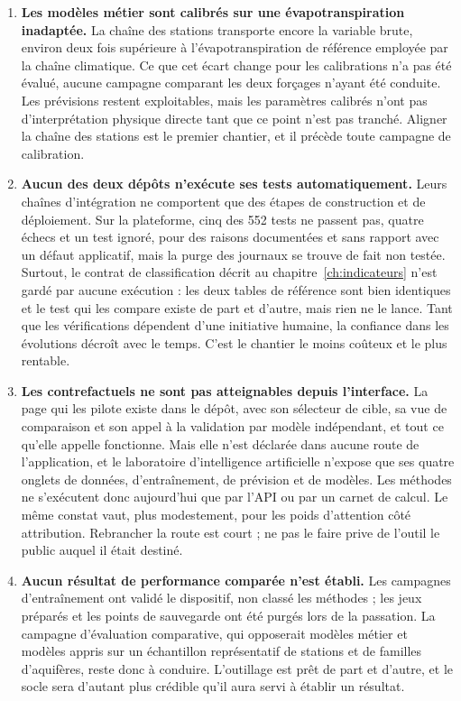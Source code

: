 \begin{enumerate}
  \item \textbf{Les modèles métier sont calibrés sur une évapotranspiration inadaptée.} La
  chaîne des stations transporte encore la variable brute, environ deux fois supérieure à
  l'évapotranspiration de référence employée par la chaîne climatique. Ce que cet écart change
  pour les calibrations n'a pas été évalué, aucune campagne comparant les deux forçages n'ayant
  été conduite. Les prévisions restent exploitables, mais les paramètres calibrés n'ont pas
  d'interprétation physique directe tant que ce point n'est pas tranché.
  Aligner la chaîne des stations est le premier chantier, et il précède toute campagne de
  calibration.

  \item \textbf{Aucun des deux dépôts n'exécute ses tests automatiquement.} Leurs chaînes
  d'intégration ne comportent que des étapes de construction et de déploiement. Sur la
  plateforme, cinq des \num{552} tests ne passent pas, quatre échecs et un test ignoré, pour des
  raisons documentées et sans rapport avec un défaut applicatif, mais la purge des journaux se
  trouve de fait non testée. Surtout, le contrat de classification décrit au
  chapitre~\ref{ch:indicateurs} n'est gardé par aucune exécution : les deux tables de référence
  sont bien identiques et le test qui les compare existe de part et d'autre, mais rien ne le
  lance. Tant que les vérifications dépendent d'une initiative humaine, la confiance dans les
  évolutions décroît avec le temps. C'est le chantier le moins coûteux et le plus rentable.

  \item \textbf{Les contrefactuels ne sont pas atteignables depuis l'interface.} La page qui les
  pilote existe dans le dépôt, avec son sélecteur de cible, sa vue de comparaison et son appel à
  la validation par modèle indépendant, et tout ce qu'elle appelle fonctionne. Mais elle n'est
  déclarée dans aucune route de l'application, et le laboratoire d'intelligence artificielle
  n'expose que ses quatre onglets de données, d'entraînement, de prévision et de modèles. Les
  méthodes ne s'exécutent donc aujourd'hui que par l'API ou par un carnet de calcul. Le même
  constat vaut, plus modestement, pour les poids d'attention côté attribution. Rebrancher la
  route est court ; ne pas le faire prive de l'outil le public auquel il était destiné.

  \item \textbf{Aucun résultat de performance comparée n'est établi.} Les campagnes
  d'entraînement ont validé le dispositif, non classé les méthodes ; les jeux préparés et les
  points de sauvegarde ont été purgés lors de la passation. La campagne d'évaluation
  comparative, qui opposerait modèles métier et modèles appris sur un échantillon représentatif
  de stations et de familles d'aquifères, reste donc à conduire. L'outillage est prêt de part et
  d'autre, et le socle sera d'autant plus crédible qu'il aura servi à établir un résultat.


\end{enumerate}

